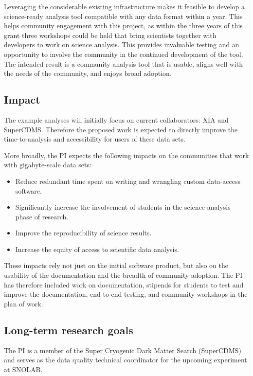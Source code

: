 Leveraging the considerable existing infrastructure makes it feasible to develop a science-ready analysis tool compatible with any data format within a year.  This helps community engagement with this project, as within the three years of this grant three workshops could be held that bring scientists together with developers to work on science analysis.  This provides invaluable testing and an opportunity to involve the community in the continued development of the tool.  The intended result is a community analysis tool that is usable, aligns well with the needs of the community, and enjoys broad adoption.

\subsection{Impact}
The example analyses will initially focus on current collaborators: XIA and SuperCDMS.  Therefore the proposed work is expected to directly improve the time-to-analysis and accessibility for users of these data sets.

More broadly, the PI expects the following impacts on the communities that work with gigabyte-scale data sets:

\begin{itemize}
    \item Reduce redundant time spent on writing and wrangling custom data-access software.
    \item Significantly increase the involvement of students in the science-analysis phase of research.
    \item Improve the reproducibility of science results. 
    \item Increase the equity of access to scientific data analysis.
\end{itemize}

These impacts rely not just on the initial software product, but also on the usability of the documentation and the breadth of community adoption.  The PI has therefore included work on documentation, stipends for students to test and improve the documentation, end-to-end testing, and community workshops in the plan of work.

\subsection{Long-term research goals}
The PI is a member of the Super Cryogenic Dark Matter Search (SuperCDMS) and serves as the data quality technical coordinator for the upcoming experiment at SNOLAB.

